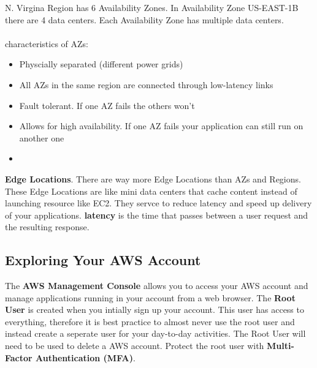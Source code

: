 \documentclass{article}%
\begin{document}
N. Virgina Region has 6 Availability Zones. In Availability Zone US-EAST-1B there are 4 data centers. Each Availability Zone has multiple data centers. \\ \\
characteristics of AZs:
\begin{itemize}
    \item Physcially separated (different power grids)
    \item All AZs in the same region are connected through low-latency links 
    \item Fault tolerant. If one AZ fails the others won't
    \item Allows for high availability. If one AZ fails your application can still run on another one
    \item 
\end{itemize}

\textbf{Edge Locations}. There are way more Edge Locations than AZs and Regions. These Edge Locations are like mini data centers that cache content instead of launching resource like EC2. They servce to reduce latency and speed up delivery of your applications. \textbf{latency} is the time that 
passes between a user request and the resulting response.  

\subsection{Exploring Your AWS Account}
The \textbf{AWS Management Console} allows you to access your AWS account and manage applications running in your account from a web browser. The \textbf{Root User} is created when you intially sign up your account. This user has access to everything, therefore it is best practice to almost never use the root user and instead create a 
seperate user for your day-to-day activities. The Root User will need to be used to delete a AWS account. Protect the root user with \textbf{Multi-Factor Authentication (MFA)}. \\ \\
\end{document}

